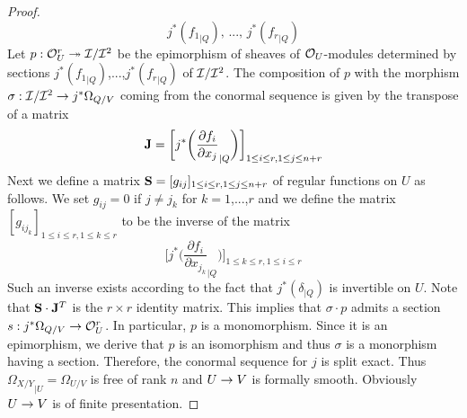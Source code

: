 \begin{proof}
$$j^*({f_1}_{\mid Q}),\,...,\,j^*({f_r}_{\mid Q})$$
Let $p: {\mathcal O}^r_U \twoheadrightarrow {\mathcal I}/{\mathcal I}^2$ be the epimorphism of sheaves of ${\mathcal O}_U$-modules determined by sections $j^*({f_1}_{\mid Q})$,...,$j^*({f_r}_{\mid Q})$ of ${\mathcal I}/{\mathcal I}^2$. The composition of $p$ with the morphism $\sigma: {\mathcal I}/{\mathcal I}^2\rightarrow j^*\Omega_{Q/V}$ coming from the conormal sequence is given by the transpose of a matrix
$$\mathbf{J}= \bigg[j^*\bigg({\frac{\partial f_i}{\partial x_j}}_{\mid Q}\bigg)\bigg]_{1\leq i\leq r, 1\leq j\leq n+r}$$
Next we define a matrix $\mathbf{S}=[g_{ij}]_{1\leq i \leq r,1\leq j\leq n+r}$ of regular functions on $U$ as follows. We set $g_{ij}=0$ if $j \neq j_k$ for $k=1$,...,$r$ and we define the matrix $[g_{ij_k}]_{1\leq i\leq r,1\leq k\leq r}$ to be the inverse of the matrix
$$\bigg[j^*\bigg({\frac{\partial f_i}{\partial x_{j_k}}}_{\mid Q}\bigg)\bigg]_{1\leq k\leq r,1\leq i\leq r}$$
Such an inverse exists according to the fact that $j^*(\delta_{\mid Q})$ is invertible on $U$. Note that $\mathbf{S} \cdot \mathbf{J}^T$ is the $r\times r$ identity matrix. This implies that $\sigma\cdot p$ admits a section $s:j^*\Omega_{Q/V}\rightarrow {\mathcal O}^r_U$. In particular, $p$ is a monomorphism. Since it is an epimorphism, we derive that $p$ is an isomorphism and thus $\sigma$ is a monorphism having a section. Therefore, the conormal sequence for $j$ is split exact. Thus ${\Omega_{X/Y}}_{\mid U}=\Omega_{U/V}$ is free of rank $n$ and $U\rightarrow V$ is formally smooth. Obviously $U\rightarrow V$ is of finite presentation.
\end{proof}

